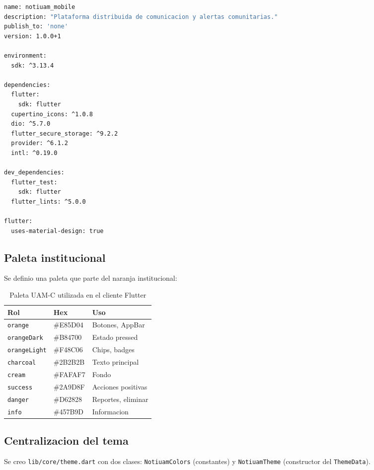 \begin{lstlisting}[language=bash]
name: notiuam_mobile
description: "Plataforma distribuida de comunicacion y alertas comunitarias."
publish_to: 'none'
version: 1.0.0+1

environment:
  sdk: ^3.13.4

dependencies:
  flutter:
    sdk: flutter
  cupertino_icons: ^1.0.8
  dio: ^5.7.0
  flutter_secure_storage: ^9.2.2
  provider: ^6.1.2
  intl: ^0.19.0

dev_dependencies:
  flutter_test:
    sdk: flutter
  flutter_lints: ^5.0.0

flutter:
  uses-material-design: true
\end{lstlisting}

\subsection{Paleta institucional}

Se definio una paleta que parte del naranja institucional:

\begin{table}[htbp]
\centering
\begin{tabular}{l l l}
\toprule
Rol & Hex & Uso \\
\midrule
\texttt{orange} & \#E85D04 & Botones, AppBar \\
\texttt{orangeDark} & \#B84700 & Estado pressed \\
\texttt{orangeLight} & \#F48C06 & Chips, badges \\
\texttt{charcoal} & \#2B2B2B & Texto principal \\
\texttt{cream} & \#FAFAF7 & Fondo \\
\texttt{success} & \#2A9D8F & Acciones positivas \\
\texttt{danger} & \#D62828 & Reportes, eliminar \\
\texttt{info} & \#457B9D & Informacion \\
\bottomrule
\end{tabular}
\caption{Paleta UAM-C utilizada en el cliente Flutter}
\end{table}

\subsection{Centralizacion del tema}

Se creo \texttt{lib/core/theme.dart} con dos clases: \texttt{NotiuamColors} (constantes) y \texttt{NotiuamTheme} (constructor del \texttt{ThemeData}).

